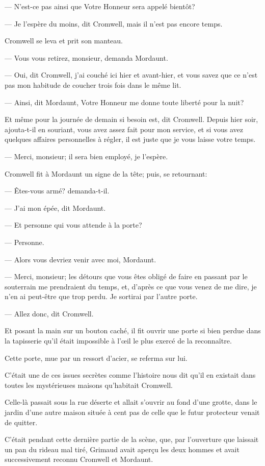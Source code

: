 — N'est-ce pas ainsi que Votre Honneur sera appelé bientôt?

— Je l'espère du moins, dit Cromwell, mais il n'est pas encore temps.

Cromwell se leva et prit son manteau.

— Vous vous retirez, monsieur, demanda Mordaunt.

— Oui, dit Cromwell, j'ai couché ici hier et avant-hier, et vous savez que ce n'est pas mon habitude de coucher trois fois dans le même lit.

— Ainsi, dit Mordaunt, Votre Honneur me donne toute liberté pour la nuit?

Et même pour la journée de demain si besoin est, dit Cromwell. Depuis hier soir, ajouta-t-il en souriant, vous avez assez fait pour mon service, et si vous avez quelques affaires personnelles à régler, il est juste que je vous laisse votre temps.

— Merci, monsieur; il sera bien employé, je l'espère.

Cromwell fit à Mordaunt un signe de la tête; puis, se retournant:

— Êtes-vous armé? demanda-t-il.

— J'ai mon épée, dit Mordaunt.

— Et personne qui vous attende à la porte?

— Personne.

— Alors vous devriez venir avec moi, Mordaunt.

— Merci, monsieur; les détours que vous êtes obligé de faire en passant par le souterrain me prendraient du temps, et, d'après ce que vous venez de me dire, je n'en ai peut-être que trop perdu. Je sortirai par l'autre porte.

— Allez donc, dit Cromwell.

Et posant la main sur un bouton caché, il fit ouvrir une porte si bien perdue dans la tapisserie qu'il était impossible à l'œil le plus exercé de la reconnaître.

Cette porte, mue par un ressort d'acier, se referma sur lui.

C'était une de ces issues secrètes comme l'histoire nous dit qu'il en existait dans toutes les mystérieuses maisons qu'habitait Cromwell.

Celle-là passait sous la rue déserte et allait s'ouvrir au fond d'une grotte, dans le jardin d'une autre maison située à cent pas de celle que le futur protecteur venait de quitter.

C'était pendant cette dernière partie de la scène, que, par l'ouverture que laissait un pan du rideau mal tiré, Grimaud avait aperçu les deux hommes et avait successivement reconnu Cromwell et Mordaunt.

